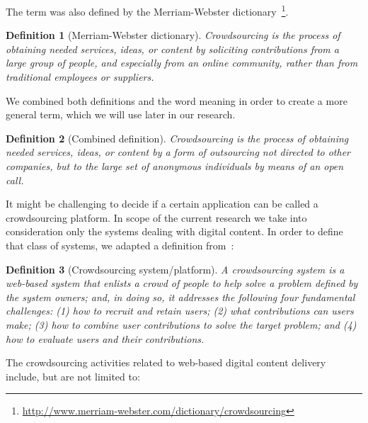 \documentclass[PhD, Submit, ngerman,UKenglish,table]{scrbook}
\newtheorem{definition}{Definition}
\begin{document}
The term was also defined by the Merriam-Webster dictionary~\footnote{\url{http://www.merriam-webster.com/dictionary/crowdsourcing}}.

\begin{definition}[Merriam-Webster dictionary]
Crowdsourcing is the process of obtaining needed services, ideas, or content by soliciting contributions from a large group of people, and especially from an online community, rather than from traditional employees or suppliers.
\end{definition}

We combined both definitions and the word meaning in order to create a more general term, which we will use later in our research.

\begin{definition}[Combined definition]
\label{def:crowdsourcing}
Crowdsourcing is the process of obtaining needed services, ideas, or content by a form of outsourcing not directed to other companies, but to the large set of anonymous individuals by means of an open call.
\end{definition}

It might be challenging to decide if a certain application can be called a crowdsourcing platform.
In scope of the current research we take into consideration only the systems dealing with digital content. 
In order to define that class of systems, we adapted a definition from~\cite{doan2011crowdsourcing}:

\begin{definition}[Crowdsourcing system/platform] 
\label{def:cs_system}
A crowdsourcing system is a web-based system that enlists a crowd of people to help solve a problem defined by the system owners; and, in doing so, it addresses the following four fundamental challenges: (1) how to recruit and retain users; (2) what contributions can users make; (3) how to combine user contributions to solve the target problem; and (4) how to evaluate users and their contributions.
\end{definition}

The crowdsourcing activities related to web-based digital content delivery include, but are not limited to:
\end{document}
